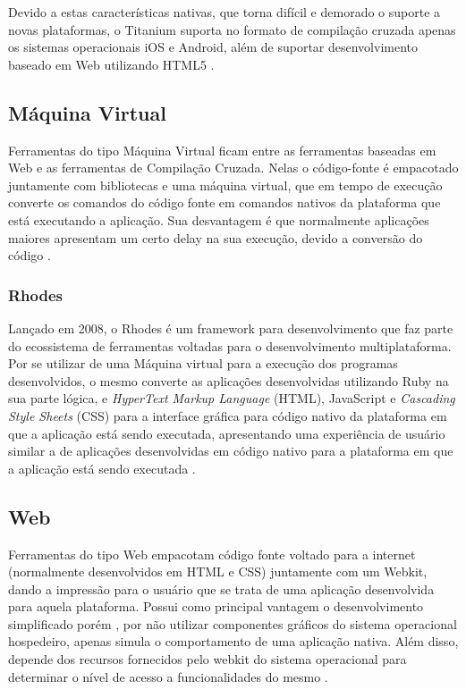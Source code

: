 Devido a estas características nativas, que torna difícil e demorado o suporte a novas plataformas, o Titanium suporta no formato de compilação cruzada apenas os sistemas operacionais iOS e Android, além de suportar desenvolvimento baseado em Web utilizando HTML5
\cite{appceleratorTitanium}.

\subsection{Máquina Virtual}
Ferramentas do tipo Máquina Virtual ficam entre as ferramentas baseadas em Web e as ferramentas de Compilação Cruzada. Nelas o código-fonte é empacotado juntamente com bibliotecas e uma máquina virtual, que em tempo de execução converte os comandos do código fonte em comandos nativos da plataforma que está executando a aplicação. Sua desvantagem é que normalmente aplicações maiores apresentam um certo delay na sua execução, devido a conversão do código
\cite{CrossPlatformMobileDevelopment2011}.

\subsubsection{Rhodes}
Lançado em 2008, o Rhodes é um framework para desenvolvimento que faz parte do ecossistema de ferramentas voltadas para o desenvolvimento multiplataforma. Por se utilizar de uma Máquina virtual para a execução dos programas desenvolvidos, o mesmo converte as aplicações desenvolvidas utilizando Ruby na sua parte lógica, e \emph{HyperText Markup Language} (HTML), JavaScript e \emph{Cascading Style Sheets} (CSS) para a interface gráfica para código nativo da plataforma em que a aplicação está sendo executada, apresentando uma experiência de usuário similar a de aplicações desenvolvidas em código nativo para a plataforma em que a aplicação está sendo executada
\cite{CrossPlatformMobileDevelopment2011}.

\subsection{Web}
Ferramentas do tipo Web empacotam código fonte voltado para a internet (normalmente desenvolvidos em HTML e CSS) juntamente com um Webkit, dando a impressão para o usuário que se trata de uma aplicação desenvolvida para aquela plataforma. Possui como principal vantagem o desenvolvimento simplificado porém , por não utilizar componentes gráficos do sistema operacional hospedeiro, apenas simula o comportamento de uma aplicação nativa. Além disso, depende dos recursos fornecidos pelo webkit do sistema operacional para determinar o nível de acesso a funcionalidades do mesmo 
\cite{CrossPlatformMobileDevelopment2011}.

